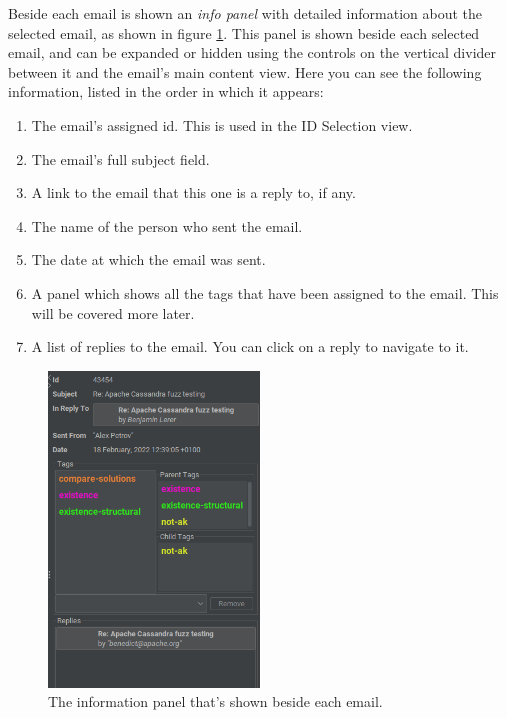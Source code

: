 \documentclass[a4paper, 12pt]{article}
\begin{document}
			Beside each email is shown an \textit{info panel} with detailed information about the selected email, as shown in figure \ref{fig:edb-app-info-panel}. This panel is shown beside each selected email, and can be expanded or hidden using the controls on the vertical divider between it and the email's main content view. Here you can see the following information, listed in the order in which it appears:
			
			\begin{enumerate}
				\item The email's assigned id. This is used in the ID Selection view.
				\item The email's full subject field.
				\item A link to the email that this one is a reply to, if any.
				\item The name of the person who sent the email.
				\item The date at which the email was sent.
				\item A panel which shows all the tags that have been assigned to the email. This will be covered more later.
				\item A list of replies to the email. You can click on a reply to navigate to it.
			\end{enumerate}
		
			\begin{figure}
				\includegraphics[width=0.5\textwidth]{img/edb-app_info-panel.png}
				\caption{The information panel that's shown beside each email.}
				\label{fig:edb-app-info-panel}
			\end{figure}
		
\end{document}
